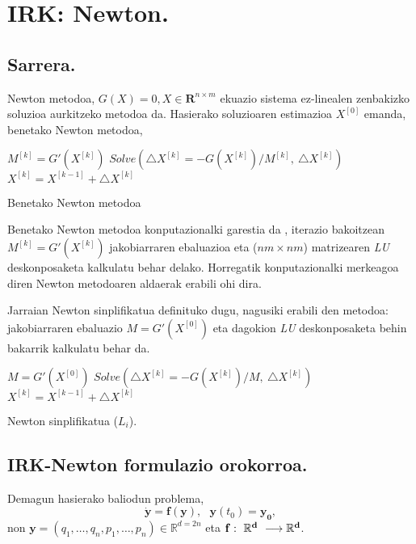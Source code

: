 \chapter{IRK: Newton.}

\section{Sarrera.}

Newton metodoa, $G(X)=0, X\in \mathbf{R}^{n \times m}$ ekuazio sistema ez-linealen zenbakizko soluzioa aurkitzeko metodoa da. Hasierako soluzioaren estimazioa  $X^{[0]}$ emanda, benetako Newton metodoa,
\begin{algorithm}[h]
  {
   \BlankLine
   $M^{[k]}=G'(X^{[k]})$\;
   $Solve (\triangle X^{[k]}=- G(X^{[k]})/{M^{[k]}},\ \triangle X^{[k]})$\;
   \BlankLine
   $X^{[k]}=X^{[k-1]}+\triangle X^{[k]}$\;
  }
 \caption{Benetako Newton metodoa}
\end{algorithm}


Benetako Newton metodoa konputazionalki garestia da , iterazio bakoitzean $M^{[k]}=G'(X^{[k]})$ jakobiarraren ebaluazioa eta ($nm \times nm$) matrizearen \emph{LU} deskonposaketa kalkulatu behar delako. Horregatik konputazionalki merkeagoa diren Newton metodoaren aldaerak erabili ohi dira. 

Jarraian Newton sinplifikatua definituko dugu, nagusiki erabili den metodoa: jakobiarraren ebaluazio $M=G'(X^{[0]})$ eta dagokion \emph{LU} deskonposaketa behin bakarrik kalkulatu behar da.
\begin{algorithm}[h]
  $M=G'(X^{[0]})$\;
  {
   \BlankLine
   $Solve (\triangle X^{[k]}=- G(X^{[k]})/{M}, \ \triangle X^{[k]})$\;
   \BlankLine
   $X^{[k]}=X^{[k-1]}+\triangle X^{[k]}$\;
  }
 \caption{Newton sinplifikatua ($L_i$).}
\end{algorithm}
 
\section{IRK-Newton formulazio orokorroa.}

Demagun hasierako baliodun problema,
\begin{equation}
\label{eq:91}
\dot{\mathbf{y}}=\mathbf{f}(\mathbf{y}),\ \ \ \mathbf{y}(t_0)=\mathbf{y_0}, 
\end{equation}
non  $\mathbf{y}=(q_1,\dots,q_n,p_1,\dots,p_n) \in \mathbb{R}^{d=2n}$  eta $\bf{f}: \  {\mathbb{R}}^d \ \longrightarrow {\mathbb{R}}^d$. 

